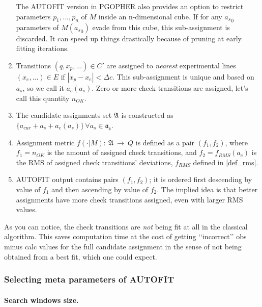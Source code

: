 \documentclass[11pt]{article}
\begin{document}
\begin{enumerate}
The AUTOFIT version in PGOPHER also provides an option to restrict parameters $p_1, ..., p_n$ of $M$ inside an n-dimensional cube. If for any ${a_s}_0$ parameters of $M({a_s}_0)$ evade from this cube, this sub-assignment is discarded.  It can speed up things drastically because of pruning at early fitting iterations.    
		\item Transitions $(q, x_p, ...) \in C'$ are assigned to \emph{nearest} experimental lines $(x_e, ...) \in E$ if $|x_p - x_e| < \Delta c$. This sub-assignment is unique and based on $a_s$, so we call it $a_c(a_s)$. Zero or more check transitions are assigned, let's call this quantity $n_{OK}$.
		\item  The candidate assignments set $\mathfrak{A}$ is constructed as $\{a_{cur} + a_s + a_c(a_s)\}\,\forall a_s \in \mathfrak{a_s}$.
	\item Assignment metric $f(\cdot | M):~\mathfrak{A}~\rightarrow~Q$ is defined as a pair $(f_1, f_2)$, where $f_1 = n_{OK}$ is the amount of assigned check transitions, and $f_2 = f_{RMS}(a_c)$ is the RMS of assigned check transitions' deviations, $f_{RMS}$ defined in \ref{def_rms}. 
	\item AUTOFIT output contains pairs $(f_1, f_2)$; it is ordered first descending by value of $f_1$ and then ascending by value of $f_2$. The implied idea is that better assignments have more check transitions assigned, even with larger RMS values. 
\end{enumerate}

As you can notice, the check transitions are \emph{not} being fit at all in the classical algorithm. This saves computation time at the cost of getting \lq\lq{}incorrect\rq\rq{} obs minus calc values for the full candidate assignment in the sense of not being obtained from a best fit, which one could expect.


\subsubsection{Selecting meta parameters of AUTOFIT}

\paragraph{Search windows size.}
\end{document}
